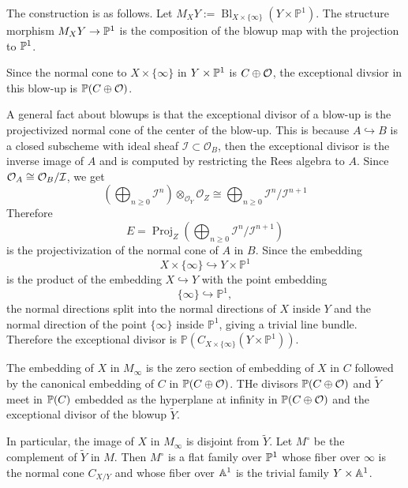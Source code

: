 \documentclass[12pt]{article}
\begin{document}
The construction is as follows. Let $M_XY
:=
\operatorname{Bl}_{X\times\{\infty\}}(Y\times \mathbb P^1).$ The structure morphism $M_XY\to \P^1$ is the composition of the blowup map with the projection to $\P^1$.  

Since the normal cone to $X\times\{\infty\}$ in $Y\times \P^1$ is $C\oplus \cO$, the exceptional divsior in this blow-up is $\P(C\oplus \mathcal O)$. 

A general fact about blowups is that the exceptional divisor of a blow-up is the projectivized normal cone of the center of the blow-up. This is because 
$A\hookrightarrow B$  is a closed subscheme with ideal sheaf $\mathcal I\subset \mathcal O_B$, then the exceptional divisor is the inverse image of $A$ and is computed by restricting the Rees algebra to $A$. Since $\cO_A\cong \cO_B/\mathcal I$, we get
\[
\left(\bigoplus_{n\geq 0}\mathcal I^n\right)\otimes_{\mathcal O_Y}\mathcal O_Z
\cong
\bigoplus_{n\geq 0}\mathcal I^n/\mathcal I^{n+1}\]
Therefore
\[
E
=
\operatorname{Proj}_Z
\left(
\bigoplus_{n\geq 0}
\mathcal I^n/\mathcal I^{n+1}
\right)\] is the projectivization of the normal cone of $A$ in $B$.
Since the embedding
\[
    X\times\{\infty\}\hookrightarrow Y\times\mathbb P^1
\]
is the product of the embedding \(X\hookrightarrow Y\) with the point embedding
\[
    \{\infty\}\hookrightarrow \mathbb P^1,
\]
the normal directions split into the normal directions of \(X\) inside $Y$ and the normal direction of the point \(\{\infty\}\) inside \(\mathbb P^1\), giving a trivial line bundle.  Therefore the exceptional divisor is $\mathbb P\left( C_{X\times\{\infty\}}(Y\times\mathbb P^1) \right)$.

The embedding of $X$ in $M_\infty$ is the zero section of embedding of $X$ in $C$ followed by the canonical embedding of $C$ in $\P(C\oplus \mathcal O)$. THe divisors $\P(C\oplus \mathcal O)$ and $\tilde Y$ meet in $\P(C)$ embedded as the hyperplane at infinity in $\P(C\oplus \mathcal O)$ and the exceptional divisor of the blowup $\tilde Y$.

In particular, the image of $X$ in $M_\infty$ is disjoint from $\tilde Y$. Let $M^\circ$ be the complement of $\tilde Y$ in $M$. Then $M^\circ$ is a flat family over $\P^1$ whose fiber over $\infty$ is the normal cone $C_{X/Y}$ and whose fiber over $\A^1$ is the trivial family $Y\times \A^1$.
\end{document}
